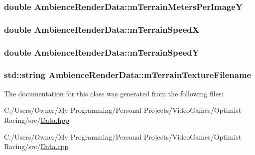 \hypertarget{class_ambience_render_data_a0ad3dba20cdff18a2de47a305399c72e}{
\subsubsection[{m\-Terrain\-Meters\-Per\-Image\-Y}]{\setlength{\rightskip}{0pt plus 5cm}double Ambience\-Render\-Data\-::m\-Terrain\-Meters\-Per\-Image\-Y}}\label{class_ambience_render_data_a0ad3dba20cdff18a2de47a305399c72e}
\hypertarget{class_ambience_render_data_ab897015a20e658f3a8cf9c4b87bcb442}{
\subsubsection[{m\-Terrain\-Speed\-X}]{\setlength{\rightskip}{0pt plus 5cm}double Ambience\-Render\-Data\-::m\-Terrain\-Speed\-X}}\label{class_ambience_render_data_ab897015a20e658f3a8cf9c4b87bcb442}
\hypertarget{class_ambience_render_data_a09b0e2e8506ffe824a2ffec40471e827}{
\subsubsection[{m\-Terrain\-Speed\-Y}]{\setlength{\rightskip}{0pt plus 5cm}double Ambience\-Render\-Data\-::m\-Terrain\-Speed\-Y}}\label{class_ambience_render_data_a09b0e2e8506ffe824a2ffec40471e827}
\hypertarget{class_ambience_render_data_a642bc5ab8f0db9224f7b00b9d6c58beb}{
\subsubsection[{m\-Terrain\-Texture\-Filename}]{\setlength{\rightskip}{0pt plus 5cm}std\-::string Ambience\-Render\-Data\-::m\-Terrain\-Texture\-Filename}}\label{class_ambience_render_data_a642bc5ab8f0db9224f7b00b9d6c58beb}


The documentation for this class was generated from the following files\-:\begin{DoxyCompactItemize}
\item 
C\-:/\-Users/\-Owner/\-My Programming/\-Personal Projects/\-Video\-Games/\-Optimist Racing/src/\hyperlink{_data_8hpp}{Data.\-hpp}\item 
C\-:/\-Users/\-Owner/\-My Programming/\-Personal Projects/\-Video\-Games/\-Optimist Racing/src/\hyperlink{_data_8cpp}{Data.\-cpp}\end{DoxyCompactItemize}
